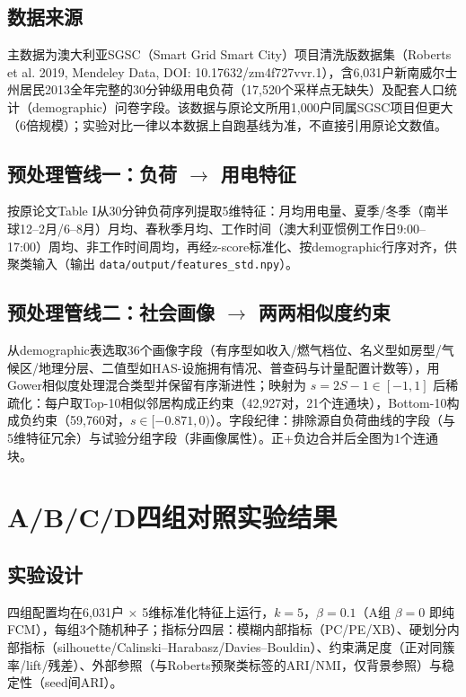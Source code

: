 \documentclass[11pt,a4paper]{ctexart}
\begin{document}
	\subsection{数据来源}
	
	主数据为澳大利亚SGSC（Smart Grid Smart City）项目清洗版数据集（Roberts et al. 2019, Mendeley Data, DOI: 10.17632/zm4f727vvr.1），含6,031户新南威尔士州居民2013全年完整的30分钟级用电负荷（17,520个采样点无缺失）及配套人口统计（demographic）问卷字段。该数据与原论文所用1,000户同属SGSC项目但更大（6倍规模）；实验对比一律以本数据上自跑基线为准，不直接引用原论文数值。
	
	\subsection{预处理管线一：负荷 $\rightarrow$ 用电特征}
	
	按原论文Table I从30分钟负荷序列提取5维特征：月均用电量、夏季/冬季（南半球12--2月/6--8月）月均、春秋季月均、工作时间（澳大利亚惯例工作日9:00--17:00）周均、非工作时间周均，再经z-score标准化、按demographic行序对齐，供聚类输入（输出 \texttt{data/output/features\_std.npy}）。
	
	\subsection{预处理管线二：社会画像 $\rightarrow$ 两两相似度约束}
	
	从demographic表选取36个画像字段（有序型如收入/燃气档位、名义型如房型/气候区/地理分层、二值型如HAS-\*设施拥有情况、普查码与计量配置计数等），用Gower相似度处理混合类型并保留有序渐进性；映射为 $s = 2S - 1 \in [-1,1]$ 后稀疏化：每户取Top-10相似邻居构成正约束（42,927对，21个连通块），Bottom-10构成负约束（59,760对，$s\in[-0.871,0)$）。字段纪律：排除源自负荷曲线的字段（与5维特征冗余）与试验分组字段（非画像属性）。正+负边合并后全图为1个连通块。
	
	\section{A/B/C/D四组对照实验结果}
	
	\subsection{实验设计}
	
	四组配置均在6,031户 $\times$ 5维标准化特征上运行，$k=5$，$\beta=0.1$（A组 $\beta=0$ 即纯FCM），每组3个随机种子；指标分四层：模糊内部指标（PC/PE/XB）、硬划分内部指标（silhouette/Calinski--Harabasz/Davies--Bouldin）、约束满足度（正对同簇率/lift/残差）、外部参照（与Roberts预聚类标签的ARI/NMI，仅背景参照）与稳定性（seed间ARI）。
	
\end{document}
